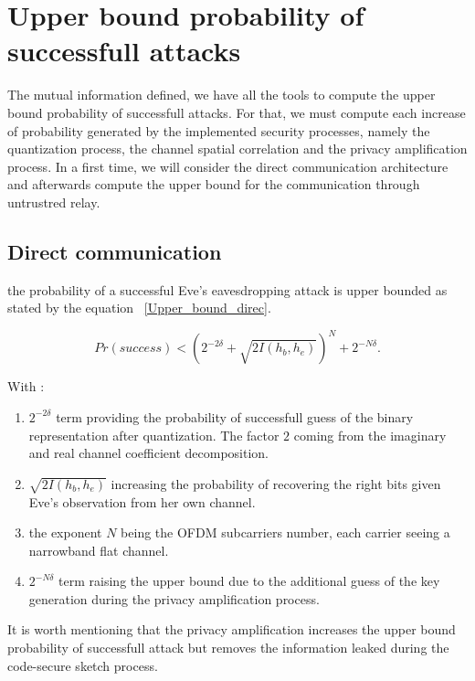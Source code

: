 \section{Upper bound probability of successfull attacks}

The mutual information defined, we have all the tools to compute the upper bound probability of successfull attacks.  For that, we must compute each increase of probability generated by the implemented security processes, namely the quantization process, the channel spatial correlation and the privacy amplification process. In a first time, we will consider the direct communication architecture and afterwards compute the upper bound for the communication through untrustred relay.

\subsection{Direct communication}

the probability of a successful Eve's eavesdropping attack is upper bounded as stated by the equation ~\ref{Upper_bound_direc}.

\begin{equation}
    Pr(success) < (2^{-2\delta} + \sqrt{2I(h_b,h_e)})^N + 2^{-N\delta}.
    \label{Upper_bound_direc}
\end{equation}

With :

\begin{enumerate}
    \item $2^{-2\delta}$ term providing the probability of successfull guess of the binary representation after quantization.  The factor $2$ coming from the imaginary and real channel coefficient decomposition.
    \item $\sqrt{2I(h_b,h_e)}$ increasing the probability of recovering the right bits given Eve's observation from her own channel.
    \item the exponent $N$ being the OFDM subcarriers number, each carrier seeing a narrowband flat channel.
    \item $2^{-N\delta}$ term raising the upper bound due to the additional guess of the key generation during the privacy amplification process.
\end{enumerate}

It is worth mentioning that the privacy amplification increases the upper bound probability of successfull attack but removes the information leaked during the code-secure sketch process.

